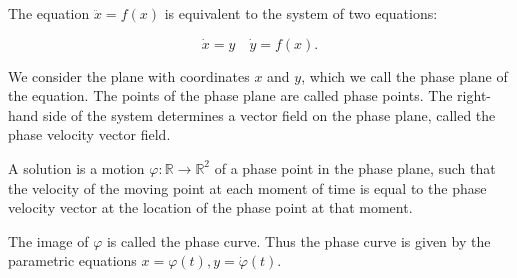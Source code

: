 The equation $\ddot{x} = f(x)$ is equivalent to the system of two equations:

$$\dot{x} = y \quad \dot{y} = f(x).$$

We consider the plane with coordinates $x$ and $y$, which we call the phase plane of the equation. The points of the phase plane are called phase points. The right-hand side of the system determines a vector field on the phase plane, called the phase velocity vector field.

A solution is a motion $\varphi: \mathbb{R} \rightarrow \mathbb{R}^2$ of a phase point in the phase plane, such that the velocity of the moving point at each moment of time is equal to the phase velocity vector at the location of the phase point at that moment.

The image of $\varphi$ is called the phase curve. Thus the phase curve is given by the parametric equations $x = \varphi(t), y = \dot{\varphi}(t)$.
